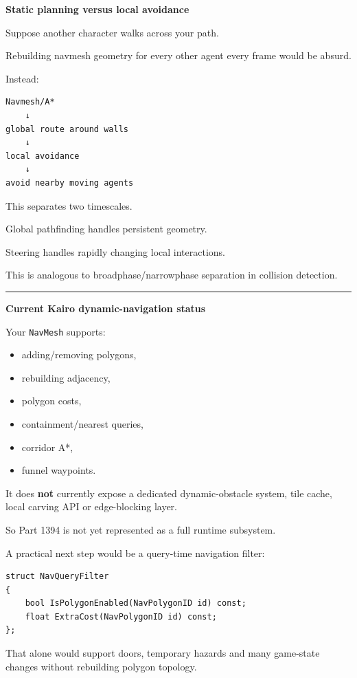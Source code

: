 \textbf{Static planning versus local avoidance}

Suppose another character walks across your path.

Rebuilding navmesh geometry for every other agent every frame would be absurd.

Instead:

\begin{verbatim}
Navmesh/A*
    ↓
global route around walls
    ↓
local avoidance
    ↓
avoid nearby moving agents
\end{verbatim}

This separates two timescales.

Global pathfinding handles persistent geometry.

Steering handles rapidly changing local interactions.

This is analogous to broadphase/narrowphase separation in collision detection.

\begin{center}\rule{0.5\linewidth}{0.5pt}\end{center}

\textbf{Current Kairo dynamic-navigation status}

Your \texttt{NavMesh} supports:

\begin{itemize}
\tightlist
\item
  adding/removing polygons,
\item
  rebuilding adjacency,
\item
  polygon costs,
\item
  containment/nearest queries,
\item
  corridor A*,
\item
  funnel waypoints.
\end{itemize}

It does \textbf{not} currently expose a dedicated dynamic-obstacle system, tile cache, local carving API or edge-blocking layer.

So Part 1394 is not yet represented as a full runtime subsystem.

A practical next step would be a query-time navigation filter:

\begin{verbatim}
struct NavQueryFilter
{
    bool IsPolygonEnabled(NavPolygonID id) const;
    float ExtraCost(NavPolygonID id) const;
};
\end{verbatim}

That alone would support doors, temporary hazards and many game-state changes without rebuilding polygon topology.

